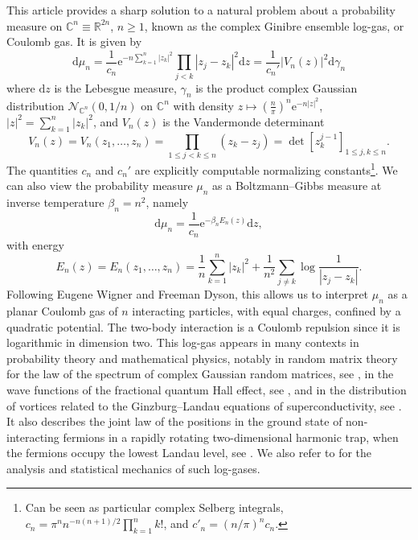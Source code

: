 \documentclass[11pt,reqno]{amsart}
\numberwithin{equation}{section}%
\numberwithin{figure}{section}%
\numberwithin{table}{section}
\theoremstyle{plain}
\theoremstyle{definition}
\begin{document}
This article provides a sharp solution to a natural problem about a
probability measure on $\mathbb{C}^n\equiv\mathbb{R}^{2n}$, $n\geq1$, known as
the complex Ginibre ensemble log-gas, or Coulomb gas. It is given by
\begin{equation}\label{eq:mu}
  \mathrm{d}\mu_n
  =\frac{1}{c_n}\mathrm{e}^{-n\sum_{k=1}^n|z_k|^2}\prod_{j<k}|z_j-z_k|^2\mathrm{d}z
  =\frac{1}{c_n'}|V_n(z)|^2\mathrm{d}\gamma_n  
\end{equation}
where $\mathrm{d}z$ is the Lebesgue measure, $\gamma_n$ is the product complex
Gaussian distribution $\mathcal{N}_{\mathbb{C}^n}(0,1/n)$ on $\mathbb{C}^n$
with density $z\mapsto(\frac{n}{\pi})^n\mathrm{e}^{-n|z|^2}$,
$|z|^2=\sum_{k=1}^n|z_k|^2$, and $V_n(z)$ is the Vandermonde determinant
\begin{equation}\label{eq:Vn}
  V_n(z)=V_n(z_1,\ldots,z_n)=\prod_{1\leq j<k\leq n}(z_k-z_j)=\det{[z_k^{j-1}]}_{1\leq j,k\leq n}.
\end{equation}
The quantities $c_n$ and $c_n'$ are explicitly computable normalizing
constants\footnote{Can be seen as particular complex Selberg integrals,
  $c_n=\pi^nn^{-n(n+1)/2}\prod_{k=1}^n k!$, and $c'_n=(n/\pi)^nc_n$.}. We can
also view the probability measure $\mu_n$ as a Boltzmann--Gibbs measure at
inverse temperature $\beta_n=n^2$, namely
\begin{equation}\label{eq:boltzmanngibbs}
  \mathrm{d}\mu_n=\frac{1}{c_n}\mathrm{e}^{-\beta_n E_n(z)}\mathrm{d}z,
\end{equation}
with energy 
\begin{equation}\label{eq:Hn}
  E_n(z)=E_n(z_1,\ldots,z_n)=\frac{1}{n}\sum_{k=1}^n|z_k|^2+\frac{1}{n^2}\sum_{j\neq k}\log\frac{1}{|z_j-z_k|}.
\end{equation}
Following Eugene Wigner and Freeman Dyson, this allows us to interpret $\mu_n$
as a planar Coulomb gas of $n$ interacting particles, with equal charges,
confined by a quadratic potential. The two-body interaction is a Coulomb
repulsion since it is logarithmic in dimension two. This log-gas appears in
many contexts in probability theory and mathematical physics, notably in
random matrix theory for the law of the spectrum of complex Gaussian random
matrices, see
\cite{Ginibre1965,ForresterLogGases,ChafaiAspects,ByunForresterGinibre}, in
the wave functions of the fractional quantum Hall effect, see \cite{Laughlin},
and in the distribution of vortices related to the Ginzburg--Landau equations
of superconductivity, see \cite{SerfatyCoulombGases}. It also describes the
joint law of the positions in the ground state of non-interacting fermions in
a rapidly rotating two-dimensional harmonic trap, when the fermions occupy the
lowest Landau level, see \cite{LacroixMajumdarSchehrGinibreFermions}. We also
refer to \cite{LewinCoulombRieszGases,SerfatyLecturesCoulombRiesz} for the
analysis and statistical mechanics of such log-gases.
\end{document}
